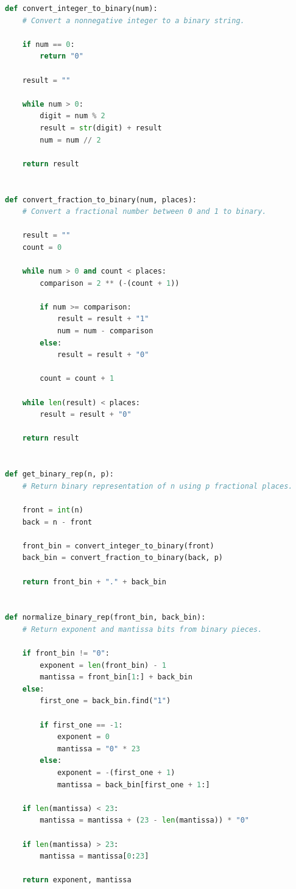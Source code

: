 \documentclass[11pt]{article}
\begin{document}
\begin{lstlisting}[language=Python]
def convert_integer_to_binary(num):
    # Convert a nonnegative integer to a binary string.

    if num == 0:
        return "0"

    result = ""

    while num > 0:
        digit = num % 2
        result = str(digit) + result
        num = num // 2

    return result


def convert_fraction_to_binary(num, places):
    # Convert a fractional number between 0 and 1 to binary.

    result = ""
    count = 0

    while num > 0 and count < places:
        comparison = 2 ** (-(count + 1))

        if num >= comparison:
            result = result + "1"
            num = num - comparison
        else:
            result = result + "0"

        count = count + 1

    while len(result) < places:
        result = result + "0"

    return result


def get_binary_rep(n, p):
    # Return binary representation of n using p fractional places.

    front = int(n)
    back = n - front

    front_bin = convert_integer_to_binary(front)
    back_bin = convert_fraction_to_binary(back, p)

    return front_bin + "." + back_bin


def normalize_binary_rep(front_bin, back_bin):
    # Return exponent and mantissa bits from binary pieces.

    if front_bin != "0":
        exponent = len(front_bin) - 1
        mantissa = front_bin[1:] + back_bin
    else:
        first_one = back_bin.find("1")

        if first_one == -1:
            exponent = 0
            mantissa = "0" * 23
        else:
            exponent = -(first_one + 1)
            mantissa = back_bin[first_one + 1:]

    if len(mantissa) < 23:
        mantissa = mantissa + (23 - len(mantissa)) * "0"

    if len(mantissa) > 23:
        mantissa = mantissa[0:23]

    return exponent, mantissa



\end{lstlisting}
\end{document}
